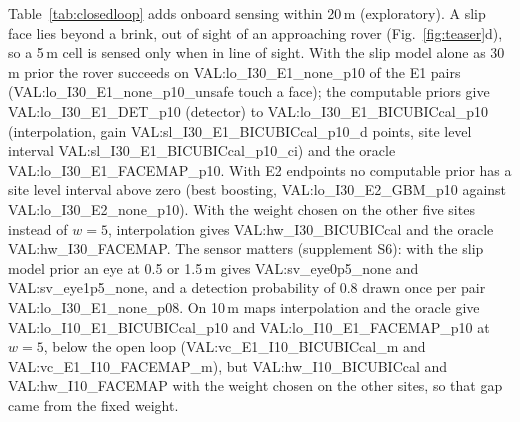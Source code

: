 Table~\ref{tab:closedloop} adds onboard sensing within 20\,m (exploratory). A slip face lies beyond a brink, out of sight of an approaching rover (Fig.~\ref{fig:teaser}d), so a 5\,m cell is sensed only when in line of sight. With the slip model alone as 30\,m prior the rover succeeds on {{VAL:lo_I30_E1_none_p10}} of the E1 pairs ({{VAL:lo_I30_E1_none_p10_unsafe}} touch a face); the computable priors give {{VAL:lo_I30_E1_DET_p10}} (detector) to {{VAL:lo_I30_E1_BICUBICcal_p10}} (interpolation, gain {{VAL:sl_I30_E1_BICUBICcal_p10_d}} points, site level interval {{VAL:sl_I30_E1_BICUBICcal_p10_ci}}) and the oracle {{VAL:lo_I30_E1_FACEMAP_p10}}. With E2 endpoints no computable prior has a site level interval above zero (best boosting, {{VAL:lo_I30_E2_GBM_p10}} against {{VAL:lo_I30_E2_none_p10}}). With the weight chosen on the other five sites instead of $w=5$, interpolation gives {{VAL:hw_I30_BICUBICcal}} and the oracle {{VAL:hw_I30_FACEMAP}}. The sensor matters (supplement S6): with the slip model prior an eye at 0.5 or 1.5\,m gives {{VAL:sv_eye0p5_none}} and {{VAL:sv_eye1p5_none}}, and a detection probability of 0.8 drawn once per pair {{VAL:lo_I30_E1_none_p08}}. On 10\,m maps interpolation and the oracle give {{VAL:lo_I10_E1_BICUBICcal_p10}} and {{VAL:lo_I10_E1_FACEMAP_p10}} at $w=5$, below the open loop ({{VAL:vc_E1_I10_BICUBICcal_m}} and {{VAL:vc_E1_I10_FACEMAP_m}}), but {{VAL:hw_I10_BICUBICcal}} and {{VAL:hw_I10_FACEMAP}} with the weight chosen on the other sites, so that gap came from the fixed weight.
